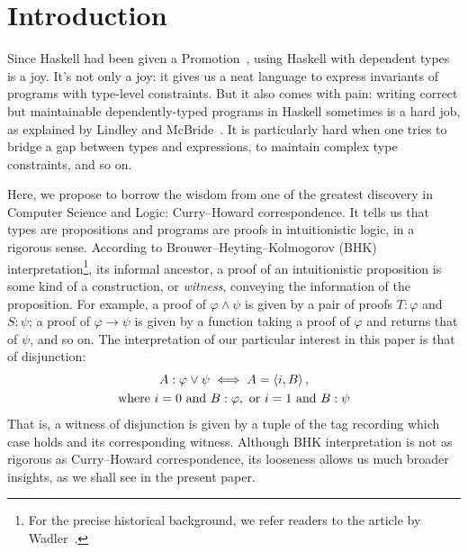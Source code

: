 \documentclass[demotion-paper.tex]{subfiles}
\begin{document}
\section{Introduction}
Since Haskell had been given a Promotion~\cite{Yorgey:2012}, using Haskell with dependent types is a joy.
It's not only a joy: it gives us a neat language to express invariants of programs with type-level constraints.
But it also comes with pain: writing correct but maintainable dependently-typed programs in Haskell sometimes is a hard job, as explained by Lindley and McBride~\cite{10.1145/2503778.2503786}.
It is particularly hard when one tries to bridge a gap between types and expressions, to maintain complex type constraints, and so on.

Here, we propose to borrow the wisdom from one of the greatest discovery in Computer Science and Logic: Curry--Howard correspondence.
It tells us that types are propositions and programs are proofs in intuitionistic logic, in a rigorous sense.
According to Brouwer--Heyting--Kolmogorov (BHK) interpretation\footnote{For the precise historical background, we refer readers to the article by Wadler~\cite{Wadler:2015aa}.}, its informal ancestor, a proof of an intuitionistic proposition is some kind of a construction, or \emph{witness}, conveying the information of the proposition.
For example, a proof of $\varphi \land \psi$ is given by a pair of proofs $T: \varphi$ and $S: \psi$; a proof of $\varphi \to \psi$ is given by a function taking a proof of $\varphi$ and returns that of $\psi$, and so on.
The interpretation of our particular interest in this paper is that of disjunction:
\begin{gather*}
  A: \varphi \vee \psi \iff A = \braket{i, B},
\\
\text{where }
i = 0 \text{ and } B: \varphi, \text{ or }
i = 1 \text{ and } B: \psi
\end{gather*}
That is, a witness of disjunction is given by a tuple of the tag recording which case holds and its corresponding witness.
Although BHK interpretation is not as rigorous as Curry--Howard correspondence, its looseness allows us much broader insights, as we shall see in the present paper.
\end{document}
